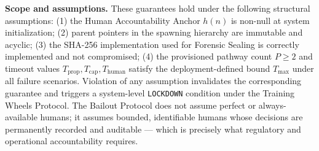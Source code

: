 \medskip
\noindent\textbf{Scope and assumptions.} These guarantees hold under the following structural assumptions: (1) the Human Accountability Anchor $h(n)$ is non-null at system initialization; (2) parent pointers in the spawning hierarchy are immutable and acyclic; (3) the SHA-256 implementation used for Forensic Sealing is correctly implemented and not compromised; (4) the provisioned pathway count $P \geq 2$ and timeout values $T_{\text{prop}}, T_{\text{cap}}, T_{\text{human}}$ satisfy the deployment-defined bound $T_{\max}$ under all failure scenarios. Violation of any assumption invalidates the corresponding guarantee and triggers a system-level \texttt{LOCKDOWN} condition under the Training Wheels Protocol. The Bailout Protocol does not assume perfect or always-available humans; it assumes bounded, identifiable humans whose decisions are permanently recorded and auditable — which is precisely what regulatory and operational accountability requires.